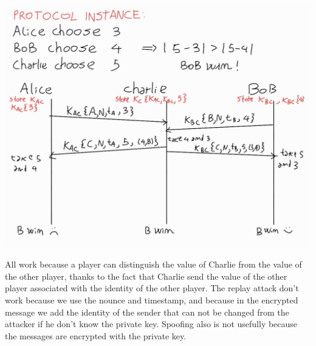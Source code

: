 \documentclass{article}
\begin{document}
\begin{center}
\includegraphics[scale=0.3]{HW06-1884749-1}
\end{center}
All work because a player can distinguish the value of Charlie from the value of the other player, thanks to the fact that Charlie send the value of the other player associated with the identity of the other player. The replay attack don't work because we use the nounce and timestamp, and because in the encrypted message we add the identity of the sender that can not be changed from the attacker if he don't know the private key. Spoofing also is not usefully because the messages are encrypted with the private key.
\end{document}
